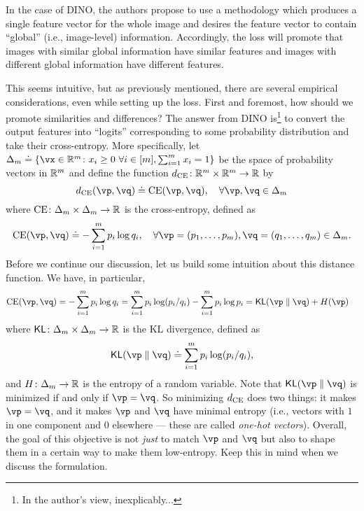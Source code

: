 \documentclass[../../book-main.tex]{subfiles}
\begin{document}
In the case of DINO, the authors propose to use a methodology which produces a single feature vector for the whole image and desires the feature vector to contain ``global'' (i.e., image-level) information. Accordingly, the loss will promote that images with similar global information have similar features and images with different global information have different features.

This seems intuitive, but as previously mentioned, there are several empirical considerations, even while setting up the loss. First and foremost, how should we promote similarities and differences? The answer from DINO \citep{caron2021emerging} is\footnote{In the author's view, inexplicably...} to convert the output features into ``logits'' corresponding to some probability distribution and take their cross-entropy. More specifically, let \(\Delta_{m} \doteq \{\vx \in \R^{m} \colon x_{i} \geq 0\ \forall i \in [m], \sum_{i = 1}^{m}x_{i} = 1\}\) be the space of probability vectors in \(\mathbb{R}^{m}\) and define the function \(d_{\operatorname{CE}} \colon \mathbb{R}^{m} \times \mathbb{R}^{m} \to \mathbb{R}\) by
 \begin{equation}\label{eq:cross_entropy_difference}
    d_{\CE}(\vp, \vq) \doteq \CE(\vp, \vq), \quad \forall \vp, \vq \in \Delta_{m}
 \end{equation}
 where \(\operatorname{CE} \colon \Delta_{m} \times \Delta_{m} \to \mathbb{R}\) is the cross-entropy, defined as 
 \begin{equation}\label{eq:expts_def_ce}
    \CE(\vp, \vq) \doteq -\sum_{i = 1}^{m}p_{i}\log q_{i}, \quad \forall \vp = (p_{1}, \dots, p_{m}), \vq = (q_{1}, \dots, q_{m}) \in \Delta_{m}.
 \end{equation}
 Before we continue our discussion, let us build some intuition about this distance function. We have, in particular,
 \begin{align}
    \CE(\vp, \vq)
    &= -\sum_{i = 1}^{m}p_{i}\log q_{i} = \sum_{i = 1}^{m}p_{i}\log(p_{i}/q_{i})
     - \sum_{i = 1}^{m}p_{i}\log p_{i} = \KL(\vp\mmid \vq) + H(\vp)
 \end{align}
 where \(\operatorname{\mathsf{KL}} \colon \Delta_{m} \times \Delta_{m} \to \mathbb{R}\) is the KL divergence, defined as 
 \begin{equation}
    \KL(\vp\mmid \vq) \doteq \sum_{i = 1}^{m}p_{i}\log(p_{i}/q_{i}),
 \end{equation}
 and \(H \colon \Delta_{m} \to \mathbb{R}\) is the entropy of a random variable. Note
 that \(\KL(\vp\mmid \vq)\) is minimized if and only if \(\vp = \vq\). So minimizing \(d_{\operatorname{CE}}\) does two things: it makes \(\vp = \vq\), and it makes \(\vp\) and \(\vq\) have minimal entropy (i.e., vectors with \(1\) in one component and \(0\) elsewhere --- these are called \textit{one-hot vectors}). Overall, the goal of this objective is not \textit{just} to match \(\vp\) and \(\vq\) but also to shape them in a certain way to make them low-entropy. Keep this in mind when we discuss the formulation.
\end{document}
